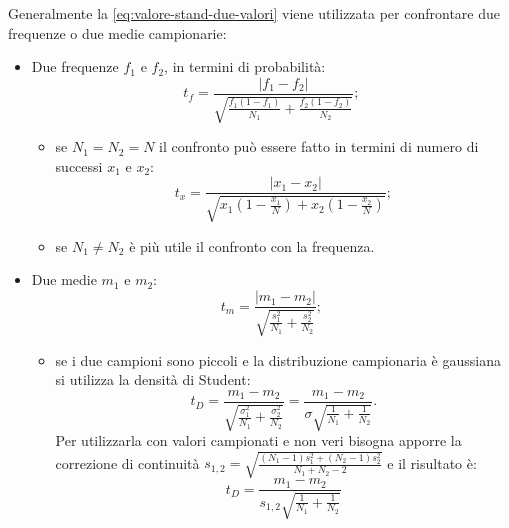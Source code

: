 Generalmente la \ref{eq:valore-stand-due-valori} viene utilizzata per confrontare due frequenze o due medie campionarie:
\begin{itemize}
\item Due frequenze $f_1$ e $f_2$, in termini di probabilità:
\begin{equation}
{ t }_{ f }=\frac { \left| { f }_{ 1 }-{ f }_{ 2 } \right|  }{ \sqrt { \frac { { f }_{ 1 }\left( 1-{ f }_{ 1 } \right)  }{ { N }_{ 1 } } +\frac { { f }_{ 2 }\left( 1-{ f }_{ 2 } \right)  }{ { N }_{ 2 } }  }  };
\end{equation}
\begin{itemize}
\item se $N_1=N_2=N$ il confronto può essere fatto in termini di numero di successi $x_1$ e $x_2$: 
\begin{equation}
{ t }_{ x }=\frac { \left| { x }_{ 1 }-x_{ 2 } \right|  }{ \sqrt { { x }_{ 1 }\left( 1-\frac { { x }_{ 1 } }{ N }  \right) +x_{ 2 }\left( 1-\frac { { x }_{ 2 } }{ N }  \right)  }  } ;
\end{equation}
\item se $N_1\neq N_2$ è più utile il confronto con la frequenza.
\end{itemize}
\item Due medie $m_1$ e $m_2$:
\begin{equation}
{ t }_{ m }=\frac { \left| { m }_{ 1 }-m_{ 2 } \right|  }{ \sqrt { \frac { { s }^{ 2 }_{ 1 } }{ N _1} +\frac { { s }^{ 2 }_{ 2 } }{ N_2 }  }  } ;
\end{equation}
\begin{itemize}
\item se i due campioni sono piccoli e la distribuzione campionaria è gaussiana si utilizza la densità di Student:
\begin{equation}
{ t }_{ D }=\frac { { m }_{ 1 }-m_{ 2 } }{ \sqrt { \frac { { \sigma  }^{ 2 }_{ 1 } }{ N_{ 1 } } +\frac { { \sigma  }^{ 2 }_{ 2 } }{ N_{ 2 } }  }  } =\frac { { m }_{ 1 }-m_{ 2 } }{ \sigma \sqrt { \frac { 1 }{ N_{ 1 } } +\frac { 1 }{ N_{ 2 } }  }  } .
\end{equation}
Per utilizzarla con valori campionati e non veri bisogna apporre la correzione di continuità ${ s }_{ 1,2 }=\sqrt { \frac { \left( { N }_{ 1 }-1 \right) { s }_{ 1 }^{ 2 }+\left( { N }_{ 2 }-1 \right) { s }_{ 2 }^{ 2 } }{ { N }_{ 1 }+{ N }_{ 2 }-2 }  } $ e il risultato è:
\begin{equation}
{ t }_{ D }=\frac { { m }_{ 1 }-m_{ 2 } }{ { s }_{ 1,2 }\sqrt { \frac { 1 }{ N_{ 1 } } +\frac { 1 }{ N_{ 2 } }  }  } 
\end{equation}
\end{itemize}
\end{itemize}

